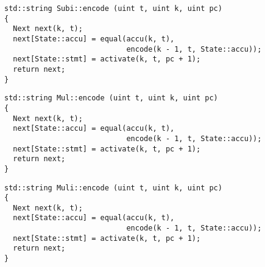 
\begin{lstlisting}[style=c++, style=encode]
std::string Subi::encode (uint t, uint k, uint pc)
{
  Next next(k, t);
  next[State::accu] = equal(accu(k, t),
                            encode(k - 1, t, State::accu));
  next[State::stmt] = activate(k, t, pc + 1);
  return next;
}
\end{lstlisting}


\begin{lstlisting}[style=c++, style=encode]
std::string Mul::encode (uint t, uint k, uint pc)
{
  Next next(k, t);
  next[State::accu] = equal(accu(k, t),
                            encode(k - 1, t, State::accu));
  next[State::stmt] = activate(k, t, pc + 1);
  return next;
}
\end{lstlisting}


\newpage

\begin{lstlisting}[style=c++, style=encode]
std::string Muli::encode (uint t, uint k, uint pc)
{
  Next next(k, t);
  next[State::accu] = equal(accu(k, t),
                            encode(k - 1, t, State::accu));
  next[State::stmt] = activate(k, t, pc + 1);
  return next;
}
\end{lstlisting}


